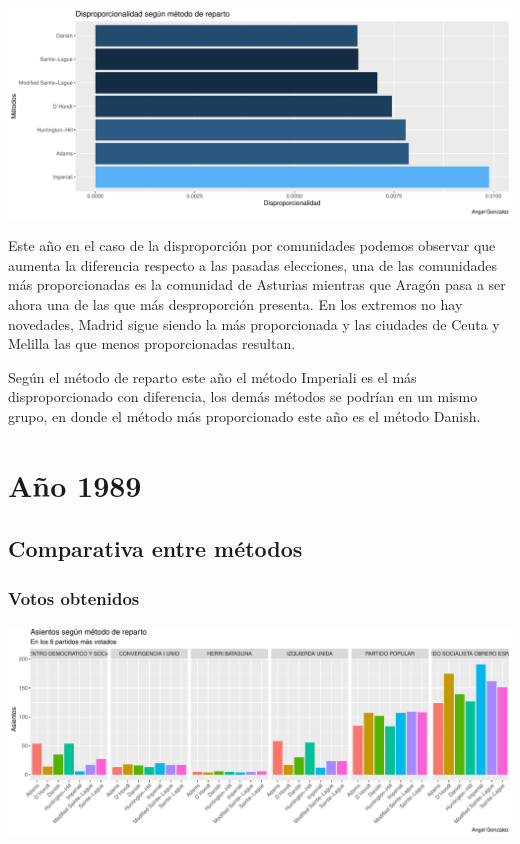 \documentclass[12pt,a4paper,]{book}
\numberwithin{dummy}{section}
\theoremstyle{ocrenumbox}
\theoremstyle{blacknumex}
\theoremstyle{blacknumbox}
\theoremstyle{ocrenum}
\theoremstyle{ocrenum}
\begin{document}
\begin{center}\includegraphics[width=0.95\linewidth]{figurasR/unnamed-chunk-87-2} \end{center}

Este año en el caso de la disproporción por comunidades podemos observar
que aumenta la diferencia respecto a las pasadas elecciones, una de las
comunidades más proporcionadas es la comunidad de Asturias mientras que
Aragón pasa a ser ahora una de las que más desproporción presenta. En
los extremos no hay novedades, Madrid sigue siendo la más proporcionada
y las ciudades de Ceuta y Melilla las que menos proporcionadas resultan.

Según el método de reparto este año el método Imperiali es el más
disproporcionado con diferencia, los demás métodos se podrían en un
mismo grupo, en donde el método más proporcionado este año es el método
Danish.

\hypertarget{auxf1o-1989}{%
\section{Año 1989}\label{auxf1o-1989}}

\hypertarget{comparativa-entre-muxe9todos-4}{%
\subsection{Comparativa entre
métodos}\label{comparativa-entre-muxe9todos-4}}

\hypertarget{votos-obtenidos-4}{%
\subsubsection{Votos obtenidos}\label{votos-obtenidos-4}}

\begin{center}\includegraphics[width=0.95\linewidth]{figurasR/unnamed-chunk-95-1} \end{center}
\end{document}
